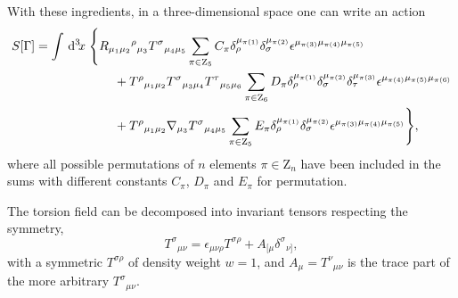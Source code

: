 \documentclass[twocolumn,
  showpacs,showkeys,prd,superscriptaddress]{revtex4-1}
\begin{document}
\begin{widetext}
  With these ingredients, in a three-dimensional space one can write an action 
  \begin{equation}
    \label{accion3d}
    \begin{split}      
      S[\Gamma] =
      \int \,{\mathrm{d}}^{3}\!{x}\; & \Bigg\{R_{\mu_1\mu_2}{}^\rho{}_{\mu_3} T^\sigma{}_{\mu_4\mu_5}\sum_{\pi \in  \mathrm{Z}_5}C_\pi\delta_\rho^{\mu_{\pi(1)}} \delta_\sigma^{\mu_{\pi(2)}}\epsilon^{\mu_{\pi(3)}\mu_{\pi(4)}\mu_{\pi(5)}} \\ 
      & \qquad + T^\rho{}_{\mu_1\mu_2} T^\sigma{}_{\mu_3\mu_4}T^\tau{}_{\mu_5\mu_6} \sum_{\pi \in \mathrm{Z}_6}D_\pi\delta_\rho^{\mu_{\pi(1)}} \delta_\sigma^{\mu_{\pi(2)}}\delta_\tau^{\mu_{\pi(3)}}\epsilon^{\mu_{\pi(4)}\mu_{\pi(5)}\mu_{\pi(6)}} \\
      & \qquad  +T^\rho{}_{\mu_1\mu_2}\nabla_{\mu_3} T^\sigma{}_{\mu_4\mu_5}\sum_{\pi \in \mathrm Z_5}E_\pi\delta_\rho^{\mu_{\pi(1)}} \delta_\sigma^{\mu_{\pi(2)}}\epsilon^{\mu_{\pi(3)}\mu_{\pi(4)}\mu_{\pi(5)}} \Bigg\}, 
    \end{split}
  \end{equation}
  where all possible permutations of $n$ elements $\pi\in\mathrm{Z}_n$ have been included in the sums with  different constants $C_\pi$, $D_\pi$ and $E_\pi$ for  permutation. 
\end{widetext}

The torsion field can be decomposed into invariant tensors respecting the symmetry,
\begin{equation}
  T^\sigma{}_{\mu\nu}=\epsilon_{\mu\nu\rho} T^{\sigma\rho}+A_{[\mu}\delta^\sigma{}_{\nu]},
\end{equation}
with a symmetric $T^{\sigma\rho}$ of density weight  $w =1$, and \mbox{$A_\mu=T^\nu{}_{\mu\nu}$} is the trace part of the more arbitrary $T^\sigma{}_{\mu\nu}$.
\end{document}
